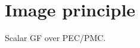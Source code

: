 \section{Image principle}
\label{sec:img_principle}

Scalar GF over PEC/PMC. \cite[p. 250]{Sommerfeld1964}






	
		
		
		
		


